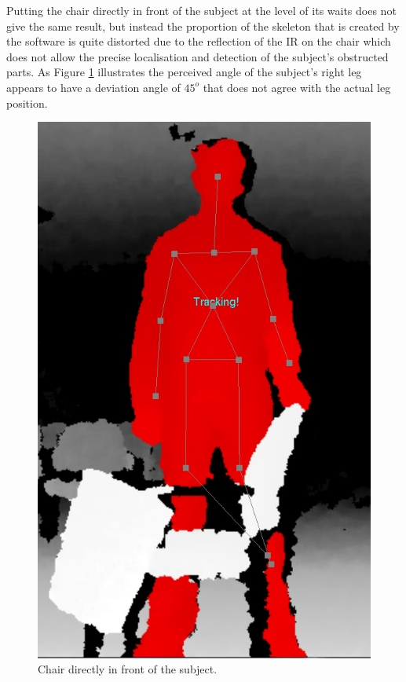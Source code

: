 \documentclass[10pt]{article}
\begin{document}
Putting the chair directly in front of the subject at the level of its waits does not give the same result, but instead the proportion of the skeleton that is created by the software is quite distorted due to the reflection of the IR on the chair which does not allow the precise localisation and detection of the subject's obstructed parts. As Figure \ref{chair} illustrates the perceived angle of the subject's right leg appears to have a deviation angle of $45^o$ that does not agree with the actual leg position.

\begin{figure}[H]
\center
\includegraphics[scale=0.2]{Chair.jpg} 
\caption{Chair directly in front of the subject.}
\label{chair}
\end{figure} 
\end{document}
